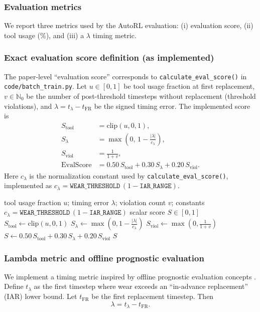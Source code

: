\documentclass[sn-basic]{sn-jnl} %
\begin{document}
\subsubsection{Evaluation metrics}
We report three metrics used by the AutoRL evaluation: (i) evaluation score, (ii) tool usage (\%), and (iii) a $\lambda$ timing metric.

\subsubsection{Exact evaluation score definition (as implemented)}
The paper-level ``evaluation score'' corresponds to \texttt{calculate\_eval\_score()} in \texttt{code/batch\_train.py}. Let $u\in[0,1]$ be tool usage fraction at first replacement, $v\in\mathbb{N}_0$ be the number of post-threshold timesteps without replacement (threshold violations), and $\lambda=t_{\lambda}-t_{\mathrm{FR}}$ be the signed timing error. The implemented score is
\begin{align}
S_{\text{tool}} &= \mathrm{clip}(u,0,1),\\
S_{\lambda} &= \max\left(0,\,1-\frac{|\lambda|}{c_{\lambda}}\right),\\
S_{\text{viol}} &= \frac{1}{1+v},\\
\mathrm{EvalScore} &= 0.50\,S_{\text{tool}} + 0.30\,S_{\lambda} + 0.20\,S_{\text{viol}}.
\end{align}
Here $c_{\lambda}$ is the normalization constant used by \texttt{calculate\_eval\_score()}, implemented as $c_{\lambda}=\texttt{WEAR\_THRESHOLD}\,(1-\texttt{IAR\_RANGE})$.

\begin{algorithm}[t]
\caption{Evaluation score computation (per evaluation run)}
\label{alg:eval_score}
\begin{algorithmic}[1]
\Require tool usage fraction $u$; timing error $\lambda$; violation count $v$; constants $c_{\lambda}=\texttt{WEAR\_THRESHOLD}\,(1-\texttt{IAR\_RANGE})$
\Ensure scalar score $S\in[0,1]$
\State $S_{\mathrm{tool}} \gets \mathrm{clip}(u, 0, 1)$
\State $S_{\lambda} \gets \max\left(0, 1 - \frac{|\lambda|}{c_{\lambda}}\right)$
\State $S_{\mathrm{viol}} \gets \max\left(0, \frac{1}{1+v}\right)$
\State $S \gets 0.50\,S_{\mathrm{tool}} + 0.30\,S_{\lambda} + 0.20\,S_{\mathrm{viol}}$
\State \Return $S$
\end{algorithmic}
\end{algorithm}

\subsubsection{Lambda metric and offline prognostic evaluation}
We implement a timing metric inspired by offline prognostic evaluation concepts \cite{Saxena2010Metrics}. Define $t_{\lambda}$ as the first timestep where wear exceeds an ``in-advance replacement'' (IAR) lower bound. Let $t_{\mathrm{FR}}$ be the first replacement timestep. Then
\begin{equation}
        \lambda = t_{\lambda} - t_{\mathrm{FR}}.
\end{equation}
\end{document}

